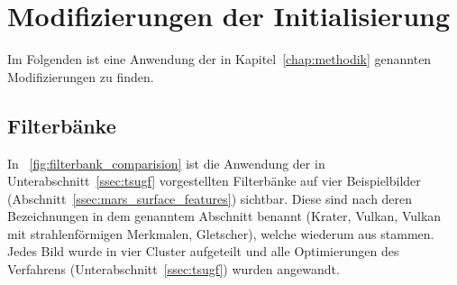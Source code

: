 \section{Modifizierungen der Initialisierung}
\label{sec:modifications}

Im Folgenden ist eine Anwendung der in Kapitel~\ref{chap:methodik} genannten Modifizierungen zu finden.

\subsection{Filterbänke}
\label{ssec:exp_filterbanks}

In \figurename~\ref{fig:filterbank_comparision} ist die Anwendung der in Unterabschnitt~\ref{ssec:tsugf} vorgestellten Filterbänke auf vier Beispielbilder (\vgl Abschnitt~\ref{ssec:mars_surface_features}) sichtbar. Diese sind nach deren Bezeichnungen in dem genanntem Abschnitt benannt (Krater, Vulkan, Vulkan mit strahlenförmigen Merkmalen, Gletscher), welche wiederum aus \cite[Kap.~7]{greeley_13} stammen. Jedes Bild wurde in vier Cluster aufgeteilt und alle Optimierungen des Verfahrens (\vgl Unterabschnitt~\ref{ssec:tsugf}) wurden angewandt.

